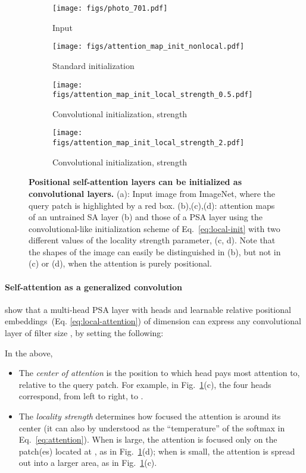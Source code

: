 \documentclass[a4paper,11pt,twocolumn]{article}
\newcommand{\citet}[1]{\textcite{#1}}
\begin{document}
\begin{figure}[tb]
    \centering
    \hspace{-1.5em}
    \begin{subfigure}[b]{.32\columnwidth}
    \texttt{[image: figs/photo\_701.pdf]}
    \caption{Input}
    \end{subfigure}
    \hspace{-1.1em}
    \begin{subfigure}[b]{.74\columnwidth}
    \texttt{[image: figs/attention\_map\_init\_nonlocal.pdf]}
    \caption{Standard initialization}
    \end{subfigure}
    \begin{subfigure}[b]{\columnwidth}
    \texttt{[image: figs/attention\_map\_init\_local\_strength\_0.5.pdf]}
    \caption{Convolutional initialization, strength }
    \end{subfigure}   
    \begin{subfigure}[b]{\columnwidth}
    \texttt{[image: figs/attention\_map\_init\_local\_strength\_2.pdf]}
    \caption{Convolutional initialization, strength }
    \end{subfigure}
    \caption{\textbf{Positional self-attention layers can be initialized as convolutional layers.} (a): Input image from ImageNet, where the query patch is highlighted by a red box. (b),(c),(d): attention maps of an untrained SA layer (b) and those of a PSA layer using the convolutional-like initialization scheme of Eq.~\ref{eq:local-init} with two different values of the locality strength parameter,  (c, d). Note that the shapes of the image can easily be distinguished in (b), but not in (c) or (d), when the attention is purely positional.}
    \label{fig:maps-init}
\end{figure}

\paragraph{Self-attention as a generalized convolution}

\citet{cordonnier2019relationship} show that a multi-head PSA layer with  heads and learnable relative positional embeddings~(Eq. \ref{eq:local-attention}) of dimension  can express any convolutional layer of filter size , by setting the following:


In the above, 
\begin{itemize}
    \item The \emph{center of attention}  is the position to which head  pays most attention to, relative to the query patch. For example, in Fig.~\ref{fig:maps-init}(c), the four heads correspond, from left to right, to .
    \item The \emph{locality strength}  determines how focused the attention is around its center  (it can also by understood as the ``temperature'' of the softmax in Eq.~\ref{eq:attention}). When  is large, the attention is focused only on the patch(es) located at , as in Fig.~\ref{fig:maps-init}(d); when  is small, the attention is spread out into a larger area, as in Fig.~\ref{fig:maps-init}(c). 
\end{itemize} 
\end{document}
